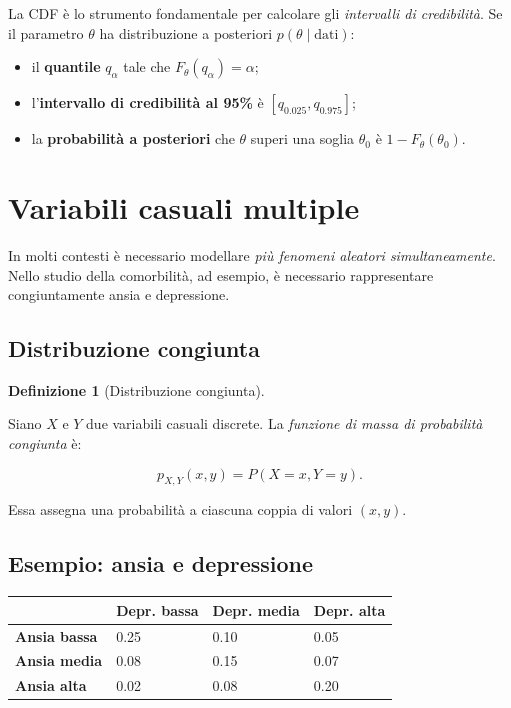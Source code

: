 \documentclass[
  italian,
  letterpaper,
  a4paper,
  11pt,
  open=any]{scrbook}
\newcounter{none} %
\providecommand{\tightlist}{%
  \setlength{\itemsep}{0pt}\setlength{\parskip}{0pt}}
\theoremstyle{plain}
\theoremstyle{definition}
\theoremstyle{definition}
\newtheorem{definition}{Definizione}[chapter]
\theoremstyle{remark}
\begin{document}
La CDF è lo strumento fondamentale per calcolare gli \emph{intervalli di
credibilità}. Se il parametro \(\theta\) ha distribuzione a posteriori
\(p(\theta \mid \text{dati})\):

\begin{itemize}
\tightlist
\item
  il \textbf{quantile} \(q_\alpha\) tale che
  \(F_\theta(q_\alpha) = \alpha\);
\item
  l'\textbf{intervallo di credibilità al 95\%} è
  \([q_{0.025}, q_{0.975}]\);
\item
  la \textbf{probabilità a posteriori} che \(\theta\) superi una soglia
  \(\theta_0\) è \(1 - F_\theta(\theta_0)\).
\end{itemize}

\section{Variabili casuali
multiple}\label{sec-multiple-random-variables}

In molti contesti è necessario modellare \emph{più fenomeni aleatori
simultaneamente}. Nello studio della comorbilità, ad esempio, è
necessario rappresentare congiuntamente ansia e depressione.

\subsection{Distribuzione congiunta}\label{distribuzione-congiunta}

\begin{definition}[Distribuzione
congiunta]\protect\hypertarget{def-joint-distribution}{}\label{def-joint-distribution}

Siano \(X\) e \(Y\) due variabili casuali discrete. La \emph{funzione di
massa di probabilità congiunta} è:

\[
p_{X,Y}(x,y) = P(X = x, Y = y).
\]

Essa assegna una probabilità a ciascuna coppia di valori \((x,y)\).

\end{definition}

\subsection{Esempio: ansia e
depressione}\label{esempio-ansia-e-depressione}

{\def\LTcaptype{none} %
\begin{longtable}[]{@{}llll@{}}
\toprule\noalign{}
& Depr. bassa & Depr. media & Depr. alta \\
\midrule\noalign{}
\endhead
\bottomrule\noalign{}
\endlastfoot
\textbf{Ansia bassa} & 0.25 & 0.10 & 0.05 \\
\textbf{Ansia media} & 0.08 & 0.15 & 0.07 \\
\textbf{Ansia alta} & 0.02 & 0.08 & 0.20 \\
\end{longtable}
}
\end{document}
